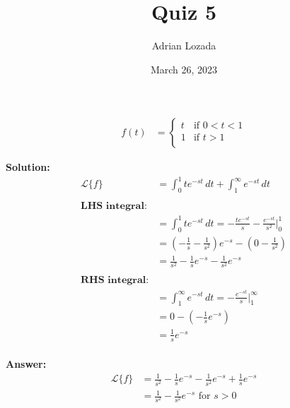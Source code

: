 \documentclass{article}
\title{Quiz 5}
\author{Adrian Lozada}
\date{March 26, 2023}
\begin{document}
    \maketitle
    \newpage
    \begin{align*}
        f(t) &= 
        \begin{cases}
            t & \text{if } 0 < t < 1 \\
            1 & \text{if } t > 1 \\
        \end{cases}
    \end{align*}
    
    \textbf{Solution:} \\
    \begin{align*}
        \mathcal{L}\{f\} &= \int_0^1 te^{-st} \, dt + \int_1^\infty e^{-st} \, dt \\
        \\ %
        \textbf{LHS integral:} \\
        &= \int_0^1 te^{-st} \, dt = -\frac{te^{-st}}{s} - \frac{e^{-st}}{s^2} \Big|_0^1 \\
        &= \left(-\frac{1}{s} - \frac{1}{s^2}\right)e^{-s} - \left(0 - \frac{1}{s^2}\right) \\
        &= \frac{1}{s^2} - \frac{1}{s}e^{-s} - \frac{1}{s^2}e^{-s} \\
        \\ %
        \textbf{RHS integral:} \\
        &= \int_1^\infty e^{-st} \, dt = -\frac{e^{-st}}{s} \Big|_1^\infty \\
        &= 0 - \left(-\frac{1}{s}e^{-s}\right) \\
        &= \frac{1}{s}e^{-s}
    \end{align*}
    \\ %
    \textbf{Answer:}
    \begin{align*}
       \mathcal{L}\{f\} &= \frac{1}{s^2} - \frac{1}{s}e^{-s} - \frac{1}{s^2}e^{-s} + \frac{1}{s}e^{-s} \\
       &= \frac{1}{s^2} - \frac{1}{s^2}e^{-s} \text{ for } s > 0
    \end{align*}    

    \newpage
    
\end{document}
